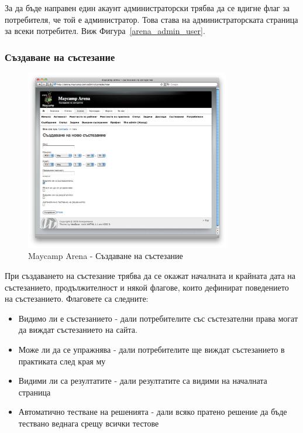 \documentclass[a4paper,12pt]{article}
\begin{document}
  За да бъде направен един акаунт администраторски трябва да се вдигне флаг за потребителя, че той е администратор. Това става на администраторската страница за всеки потребител. Виж Фигура~\ref{arena_admin_user}.
  
  \pagebreak
  
  \subsubsection{Създаване на състезание}

  \begin{figure}[ht]
    \begin{center}
      \includegraphics[width=0.8\textwidth]{images/maycamp_arena_admin_contest.png}
    \end{center}
    \caption{Maycamp Arena - Създаване на състезание}
    \label{arena_admin_contest}
  \end{figure}
  
  При създаването на състезание трябва да се окажат началната и крайната дата на състезанието, продължителност и някой флагове, които дефинират поведението на състезанието. Флаговете са следните:
  \begin{itemize}
    \item Видимо ли е състезанието - дали потребителите със състезателни права могат да виждат състезанието на сайта.
    \item Може ли да се упражнява - дали потребителите ще виждат състезанието в практиката след края му
    \item Видими ли са резултатите - дали резултатите са видими на началната страница
    \item Автоматично тестване на решенията - дали всяко пратено решение да бъде тествано веднага срещу всички тестове
  \end{itemize}
  
\end{document}
